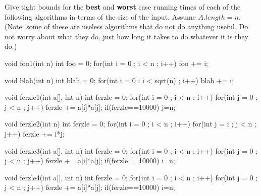 \begin{pro}
Give tight bounds for the {\bf best} and {\bf worst} case running times of each of the following algorithms in terms of the size of the input.
Assume $A.length=n$.  (Note: some of these are useless algorithms that do not do anything useful. Do not worry about what
they do, just how long it takes to do whatever it is they do.)
\begin{lenum}
\item
\begin{code}
void foo1(int n) {
    int foo = 0;
    for(int i = 0 ; i < n ; i++)
      foo += i;
}
\end{code}

\newpage

\item
\begin{code}
void blah(int n) {
    int blah = 0;
    for(int i = 0 ; i < sqrt(n) ; i++)
      blah += i;
}
\end{code}

\item
\begin{code}
void ferzle1(int a[], int n) {
    int ferzle = 0;
    for(int i = 0 ; i < n ; i++) {
        for(int j = 0 ; j < n ; j++) {
            ferzle += a[i]*a[j];
            if(ferzle==10000) {
                j=n;
            }
        }
    }
} 
\end{code}

\item
\begin{code}
void ferzle2(int n) {
    int ferzle = 0;
    for(int i = 0 ; i < n ; i++) {
        for(int j = i ; j < n ; j++) {
            ferzle += i*j;
        }
    }
}
\end{code}

\item
\begin{code}
void ferzle3(int a[], int n) {
    int ferzle = 0;
    for(int i = 0 ; i < n ; i++) {
        for(int j = 0 ; j < n ; j++) {
            ferzle += a[i]*a[j];
            if(ferzle==10000) {
                i=n;
            }
        }
    }
} 
\end{code}

\item
\begin{code}
void ferzle4(int a[], int n) {
    int ferzle = 0;
    for(int i = 0 ; i < n ; i++) {
        for(int j = 0 ; j < n ; j++) {
            ferzle += a[i]*a[j];
        }            
        if(ferzle==10000) {
            i=n;
        }
    }
} 
\end{code}


\end{lenum}
\end{pro}
